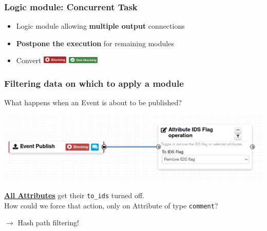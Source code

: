 \begin{frame}
    \frametitle{Logic module: Concurrent Task}
    \begin{itemize}
        \item Logic module allowing \textbf{multiple output} connections
        \item \textbf{Postpone the execution} for remaining modules
        \item Convert \includegraphics[valign=b,width=44px]{pictures/blocking-workflow.png}  \includegraphics[valign=b,width=56px]{pictures/non-blocking-workflow.png}
    \end{itemize}
    \begin{center}
    \end{center}
\end{frame}

\begin{frame}
    \frametitle{Filtering data on which to apply a module}
    What happens when an Event is about to be published?
    \begin{center}
        \includegraphics[width=1.0\textwidth]{pictures/remove-ids-1.png}
    \end{center}
    \pause
    \vspace{1em}
    \underline{\bf All Attributes} get their \texttt{to\_ids} turned off.\\
    \vspace{1em}
    {\Large {}} How could we force that action, only on Attribute of type \texttt{comment}?    
    \pause
    \begin{center}
        $\rightarrow$ Hash path filtering!
    \end{center}
\end{frame}

